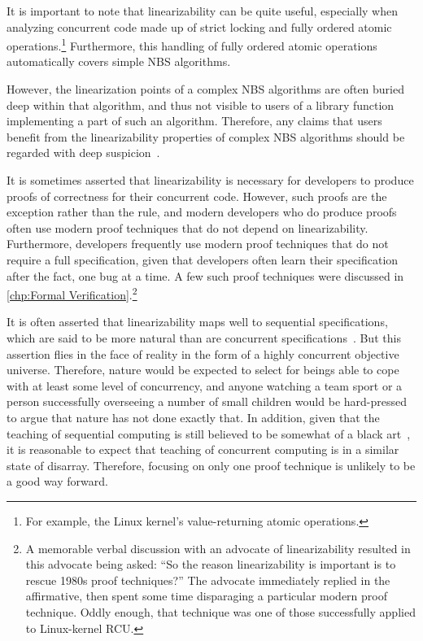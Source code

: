 It is important to note that linearizability can be quite useful,
especially when analyzing concurrent code made up of strict locking
and fully ordered atomic operations.\footnote{
	For example, the Linux kernel's value-returning atomic operations.}
Furthermore, this handling of fully ordered atomic operations
automatically covers simple NBS algorithms.

However, the linearization points of a complex NBS algorithms are often
buried deep within that algorithm, and thus not visible to users of
a library function implementing a part of such an algorithm.
Therefore, any claims that users benefit from the linearizability properties
of complex NBS algorithms should be regarded with deep
suspicion~\cite{AndreasHaas2012FIFOisnt}.

It is sometimes asserted that linearizability is necessary for developers
to produce proofs of correctness for their concurrent code.
However, such proofs are the exception rather than the rule, and modern
developers who do produce proofs often use modern proof techniques that
do not depend on linearizability.
Furthermore, developers frequently use modern proof techniques that do
not require a full specification, given that developers often learn
their specification after the fact, one bug at a time.
A few such proof techniques were discussed in
\cref{chp:Formal Verification}.\footnote{
	A memorable verbal discussion with an advocate of linearizability
	resulted in this advocate being asked:
	``So the reason linearizability is important is to rescue 1980s
	proof techniques?''
	The advocate immediately replied in the affirmative, then spent
	some time disparaging a particular modern proof technique.
	Oddly enough, that technique was one of those successfully
	applied to Linux-kernel RCU.}

It is often asserted that linearizability maps well to sequential
specifications, which are said to be more natural than are concurrent
specifications~\cite{SergioRajsbaum2020HistoryLinearizability}.
But this assertion flies in the face of reality in the form of a highly
concurrent objective universe.
Therefore, nature would be expected to select for beings able to cope
with at least some level of concurrency, and anyone watching a team sport
or a person successfully overseeing a number of small children would be
hard-pressed to argue that nature has not done exactly that.
In addition, given that the teaching of sequential
computing is still believed to be somewhat of a black
art~\cite{ElizabethPatitsas2020GradesNotBimodal}, it is reasonable
to expect that teaching of concurrent computing is in a similar state
of disarray.
Therefore, focusing on only one proof technique is unlikely to be a
good way forward.

